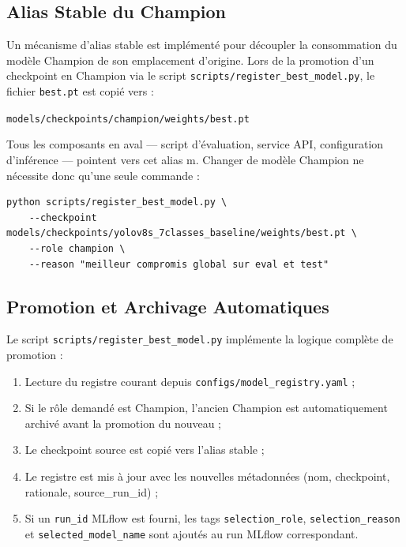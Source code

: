 \documentclass{rapportENSIAS}
\newcommand{\projectpath}[1]{\texttt{#1}}
\begin{document}
\subsection{Alias Stable du Champion}

Un mécanisme d'alias stable est implémenté pour découpler la
consommation du modèle Champion de son emplacement d'origine.
Lors de la promotion d'un checkpoint en Champion via le script
\projectpath{scripts/register\_best\_model.py}, le fichier
\texttt{best.pt} est copié vers :

\begin{center}
\texttt{models/checkpoints/champion/weights/best.pt}
\end{center}

Tous les composants en aval — script d'évaluation, service API,
configuration d'inférence — pointent vers cet alias  m.
Changer de modèle Champion ne nécessite donc qu'une seule commande :

\begin{verbatim}
python scripts/register_best_model.py \
    --checkpoint models/checkpoints/yolov8s_7classes_baseline/weights/best.pt \
    --role champion \
    --reason "meilleur compromis global sur eval et test"
\end{verbatim}

\subsection{Promotion et Archivage Automatiques}

Le script \projectpath{scripts/register\_best\_model.py} implémente
la logique complète de promotion :

\begin{enumerate}
    \item Lecture du registre courant depuis
          \projectpath{configs/model\_registry.yaml} ;
    \item Si le rôle demandé est Champion, l'ancien Champion est
          automatiquement archivé avant la promotion du nouveau ;
    \item Le checkpoint source est copié vers l'alias stable ;
    \item Le registre est mis à jour avec les nouvelles métadonnées
          (nom, checkpoint, rationale, source\_run\_id) ;
    \item Si un \texttt{run\_id} MLflow est fourni, les tags
          \texttt{selection\_role}, \texttt{selection\_reason} et
          \texttt{selected\_model\_name} sont ajoutés au run MLflow
          correspondant.
\end{enumerate}
\end{document}
